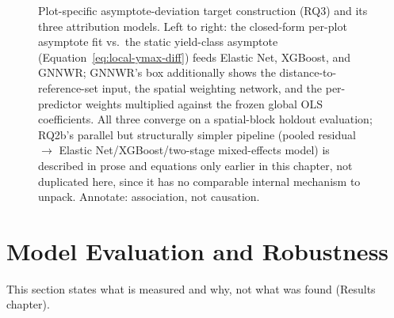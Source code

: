 \begin{figure}[!htbp]
\centering
{}
\caption{Plot-specific asymptote-deviation target construction (RQ3) and its three attribution
models. Left to right: the closed-form per-plot asymptote fit vs.\ the static yield-class
asymptote (Equation~\ref{eq:local-ymax-diff}) feeds Elastic Net, XGBoost, and GNNWR; GNNWR's box
additionally shows the distance-to-reference-set input, the spatial weighting network, and the
per-predictor weights multiplied against the frozen global OLS coefficients. All three converge on
a spatial-block holdout evaluation; RQ2b's parallel but structurally simpler pipeline (pooled
residual $\to$ Elastic Net/XGBoost/two-stage mixed-effects model) is described in prose and
equations only earlier in this chapter, not duplicated here, since it has no comparable internal
mechanism to unpack. Annotate: association, not causation.}
\label{fig:rq3-attribution}
\end{figure}

\section{Model Evaluation and Robustness}
\label{sec:eval-diagnostics}
This section states what is measured and why, not what was found (Results chapter).

